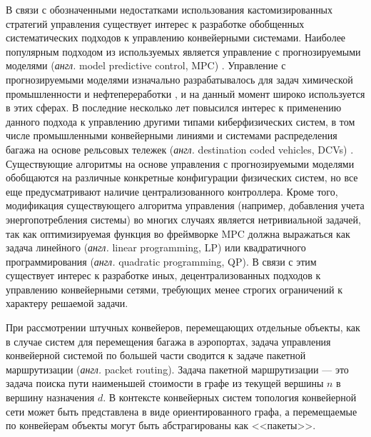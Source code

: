 \documentclass[specification,annotation,times]{itmo-student-thesis}
\theoremstyle{definition}
\begin{document}
В связи с обозначенными недостатками использования кастомизированных стратегий
управления существует интерес к разработке обобщенных систематических подходов к
управлению конвейерными системами. Наиболее популярным подходом из используемых
является управление с прогнозируемыми моделями (\textit{англ.} model predictive
control, MPC) \cite{qin2003survey}. Управление с прогнозируемыми моделями
изначально разрабатывалось для задач химической промышленности и
нефтепереработки \cite{eaton1992model}, и на данный момент широко используется в
этих сферах. В последние несколько лет повысился интерес к применению данного
подхода к управлению другими типами киберфизических систем, в том числе
промышленными конвейерными линиями \cite{cataldo2016dynamic, luo2015energy} и
системами распределения багажа на основе рельсовых тележек (\textit{англ.}
destination coded vehicles, DCVs) \cite{tarau2010model, zeinaly2015integrated}.
Существующие алгоритмы на основе управления с прогнозируемыми моделями
обобщаются на различные конкретные конфигурации физических систем, но все еще
предусматривают наличие централизованного контроллера. Кроме того, модификация
существующего алгоритма управления (например, добавления учета энергопотребления
системы) во многих случаях является нетривиальной задачей, так как
оптимизируемая функция во фреймворке MPC должна выражаться как задача линейного
(\textit{англ.} linear programming, LP) или квадратичного программирования
(\textit{англ.} quadratic programming, QP). В связи с этим существует интерес к
разработке иных, децентрализованных подходов к управлению конвейерными сетями,
требующих менее строгих ограничений к характеру решаемой задачи.

При рассмотрении штучных конвейеров, перемещающих отдельные объекты, как в
случае систем для перемещения багажа в аэропортах, задача управления конвейерной
системой по большей части сводится к задаче пакетной маршрутизации
(\textit{англ.} packet routing). Задача пакетной маршрутизации --- это задача
поиска пути наименьшей стоимости в графе из текущей вершины $n$ в вершину
назначения $d$. В контексте конвейерных систем топология конвейерной сети может
быть представлена в виде ориентированного графа, а перемещаемые по конвейерам
объекты могут быть абстрагированы как <<пакеты>>. 
\end{document}
